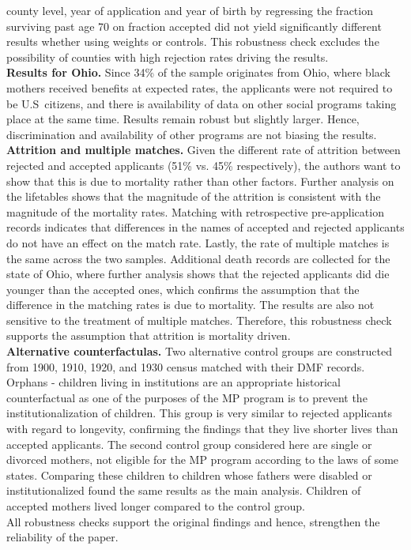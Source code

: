   county level, year of application and year of birth by regressing the
  fraction surviving past age 70 on fraction accepted did not yield
  significantly different results whether using weights or controls.
  This robustness check excludes the possibility of counties with high
  rejection rates driving the results.\\
  \textbf{Results for Ohio.} Since 34\% of the sample originates from
  Ohio, where black mothers received benefits at expected rates, the
  applicants were not required to be U.S~citizens, and there is
  availability of data on other social programs taking place at the same
  time. Results remain robust but slightly larger. Hence, discrimination
  and availability of other programs are not biasing the results.\\
  \textbf{Attrition and multiple matches.} Given the different rate of
  attrition between rejected and accepted applicants (51\% vs. 45\%
  respectively), the authors want to show that this is due to mortality
  rather than other factors. Further analysis on the lifetables shows
  that the magnitude of the attrition is consistent with the magnitude
  of the mortality rates. Matching with retrospective pre-application
  records indicates that differences in the names of accepted and
  rejected applicants do not have an effect on the match rate. Lastly,
  the rate of multiple matches is the same across the two samples.
  Additional death records are collected for the state of Ohio, where
  further analysis shows that the rejected applicants did die younger
  than the accepted ones, which confirms the assumption that the
  difference in the matching rates is due to mortality. The results are
  also not sensitive to the treatment of multiple matches. Therefore, this robustness check supports the assumption that attrition is mortality driven. \\
  \textbf{Alternative counterfactulas.} Two alternative control groups
  are constructed from 1900, 1910, 1920, and 1930 census matched with
  their DMF records. Orphans - children living in institutions are an
  appropriate historical counterfactual as one of the purposes of the MP
  program is to prevent the institutionalization of children. This group
  is very similar to rejected applicants with regard to longevity,
  confirming the findings that they live shorter lives than accepted
  applicants. The second control group considered here are single or
  divorced mothers, not eligible for the MP program according to the
  laws of some states. Comparing these children to children whose
  fathers were disabled or institutionalized found the same results as
  the main analysis. Children of accepted mothers lived longer compared
  to the control group.\\
All robustness checks support the original findings and hence,
strengthen the reliability of the paper.
